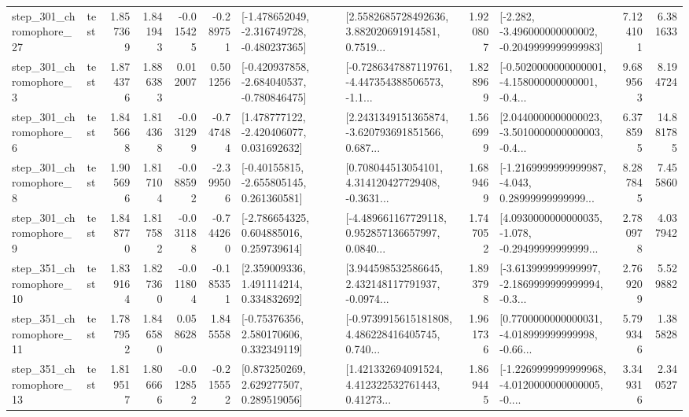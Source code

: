 \begin{tabular}{llrrrrllrlrr}
  step\_301\_chromophore\_27 &      test &      1.857369 &    1.841943 &     -0.015425 & -0.289751 &  [-1.478652049, -2.316749728, -0.480237365] &  [2.5582685728492636, 3.882020691914581, 0.7519... &       1.920807 &  [-2.282, -3.496000000000002, -0.2049999999999983] &            7.124101 &          6.381633 \\
   step\_301\_chromophore\_3 &      test &      1.874376 &    1.886383 &      0.012007 &  0.501256 &  [-0.420937858, -2.684040537, -0.780846475] &  [-0.7286347887119761, -4.447354388506573, -1.1... &       1.828969 &  [-0.5020000000000001, -4.158000000000001, -0.4... &            9.689563 &          8.194724 \\
   step\_301\_chromophore\_6 &      test &      1.845668 &    1.814368 &     -0.031299 & -0.747484 &    [1.478777122, -2.420406077, 0.031692632] &  [2.2431349151365874, -3.620793691851566, 0.687... &       1.566999 &  [2.0440000000000023, -3.5010000000000003, -0.4... &            6.378595 &         14.881785 \\
   step\_301\_chromophore\_8 &      test &      1.905696 &    1.817104 &     -0.088592 & -2.399506 &    [-0.40155815, -2.655805145, 0.261360581] &  [0.708044513054101, 4.314120427729408, -0.3631... &       1.689469 &  [-1.2169999999999987, -4.043, 0.28999999999999... &            8.287845 &          7.455860 \\
   step\_301\_chromophore\_9 &      test &      1.848770 &    1.817582 &     -0.031188 & -0.744260 &    [-2.786654325, 0.604885016, 0.259739614] &  [-4.489661167729118, 0.952857136657997, 0.0840... &       1.747052 &  [4.0930000000000035, -1.078, -0.29499999999999... &            2.780978 &          4.037942 \\
  step\_351\_chromophore\_10 &      test &      1.839164 &    1.827360 &     -0.011804 & -0.185351 &     [2.359009336, 1.491114214, 0.334832692] &  [3.944598532586645, 2.432148117791937, -0.0974... &       1.893798 &  [-3.613999999999997, -2.1869999999999994, -0.3... &            2.769209 &          5.529882 \\
  step\_351\_chromophore\_11 &      test &      1.787952 &    1.846580 &      0.058628 &  1.845558 &     [-0.75376356, 2.580170606, 0.332349119] &  [-0.9739915615181808, 4.486228416405745, 0.740... &       1.961736 &  [0.7700000000000031, -4.018999999999998, -0.66... &            5.799346 &          1.385828 \\
  step\_351\_chromophore\_13 &      test &      1.819517 &    1.806666 &     -0.012852 & -0.215552 &     [0.873250269, 2.629277507, 0.289519056] &  [1.421332694091524, 4.412322532761443, 0.41273... &       1.869445 &  [-1.2269999999999968, -4.0120000000000005, -0.... &            3.349316 &          2.340527 \\

\end{tabular}
